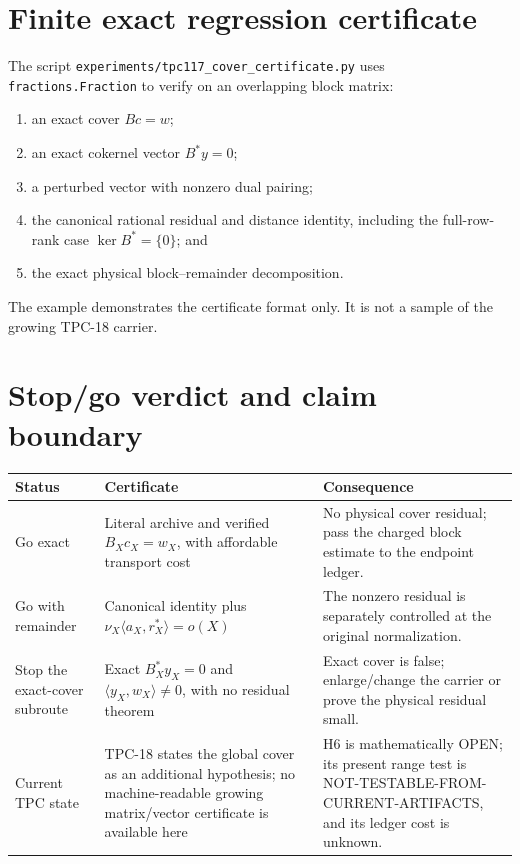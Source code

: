 \documentclass[11pt]{article}
\theoremstyle{definition}
\theoremstyle{remark}
\newcommand{\Ker}{\operatorname{ker}}
\begin{document}
\section{Finite exact regression certificate}

The script
\texttt{experiments/tpc117\_cover\_certificate.py} uses
\texttt{fractions.Fraction} to verify on an overlapping block matrix:
\begin{enumerate}[leftmargin=2em]
\item an exact cover \(Bc=w\);
\item an exact cokernel vector \(B^*y=0\);
\item a perturbed vector with nonzero dual pairing;
\item the canonical rational residual and distance identity,
  including the full-row-rank case \(\Ker B^*=\{0\}\); and
\item the exact physical block--remainder decomposition.
\end{enumerate}
The example demonstrates the certificate format only.  It is not a
sample of the growing TPC-18 carrier.

\section{Stop/go verdict and claim boundary}

\begin{center}
\small
\begin{tabularx}{\textwidth}{@{}p{}p{}X@{}}
\toprule
Status & Certificate & Consequence\\
\midrule
Go exact &
Literal archive and verified \(B_Xc_X=w_X\), with affordable
transport cost &
No physical cover residual; pass the charged block estimate to the
endpoint ledger.\\
Go with remainder &
Canonical identity plus
\(\nu_X\langle a_X,r_X^*\rangle=o(X)\) &
The nonzero residual is separately controlled at the original
normalization.\\
Stop the exact-cover subroute &
Exact \(B_X^*y_X=0\) and
\(\langle y_X,w_X\rangle\ne0\), with no residual theorem &
Exact cover is false; enlarge/change the carrier or prove the
physical residual small.\\
Current TPC state &
TPC-18 states the global cover as an additional hypothesis; no
machine-readable growing matrix/vector certificate is available
here &
H6 is mathematically OPEN; its present range test is
NOT-TESTABLE-FROM-CURRENT-ARTIFACTS, and its ledger cost is unknown.\\
\bottomrule
\end{tabularx}
\end{center}
\end{document}
